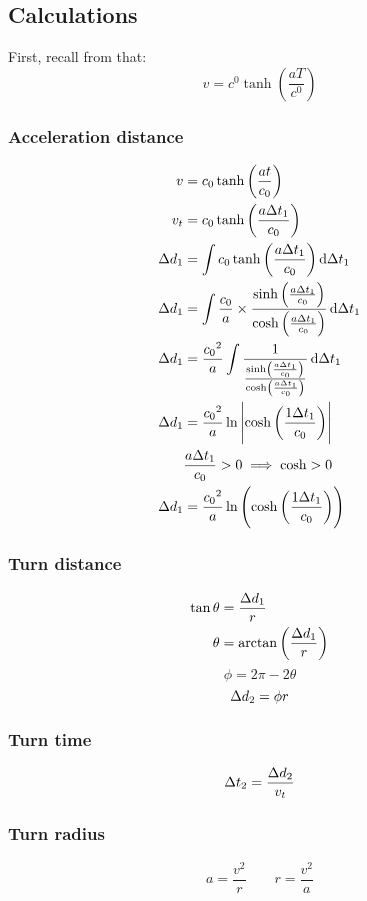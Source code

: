 	\subsection{Calculations}
		First, recall from \cite{sracceleration} that:
		\[v = \si{\clight} \tanh \left(\frac{aT}{\si{\clight}}\right)\]
		\begin{samepagecols}{2}
			\subsubsection{Acceleration distance}
			\begin{align*}
				v &= \si{\clight}\tanh\left(\frac{at}{\si{\clight}}\right)\\
				v_t &= \si{\clight}\tanh\left(\frac{a \Del t_1}{\si{\clight}}\right)\\
				\Del d_1 &= \int \si{\clight}\tanh\left(\frac{a \Del t_1}{\si{\clight}}\right) \dif \Del t_1\\
				\Del d_1 &= \int \frac{\si{\clight}}{a} \times \frac{\sinh\left(\frac{a \Del t_1}{\si{\clight}}\right)}{\cosh\left(\frac{a \Del t_1}{\si{\clight}}\right)} \dif \Del t_1\\
				\Del d_1 &= \frac{\si{\clight}^2}{a} \int \frac{1}{\frac{\sinh\left(\frac{a \Del t_1}{\si{\clight}}\right)}{\cosh\left(\frac{a \Del t_1}{\si{\clight}}\right)}} \dif \Del t_1\\
				\Del d_1 &= \frac{\si{\clight}^2}{a} \ln\left| \cosh\left(\frac{1 \Del t_1}{\si{\clight}}\right)\right|\\
				&\frac{a \Del t_1}{\si{\clight}} > 0 \implies \cosh > 0\\
				\Del d_1 &= \frac{\si{\clight}^2}{a} \ln\left(\cosh\left(\frac{1 \Del t_1}{\si{\clight}}\right)\right)
			\end{align*}
			\columnbreak
			\subsubsection{Turn distance}
				\begin{align*}
					\tan \theta &= \frac{\mathrm{\Delta} d_1}{r}\\
					\theta &= \arctan\left(\frac{\mathrm{\Delta} d_1}{r}\right)
				\end{align*}
				\begin{equation*}
					\phi = 2\pi - 2\theta
				\end{equation*}
				\begin{equation*}
					\mathrm{\Delta} d_2 = \phi r
				\end{equation*}
			\subsubsection{Turn time}
				\begin{equation*}
					\mathrm{\Delta} t_2 = \frac{\mathrm{\Delta} d_2}{v_t}
				\end{equation*}
			\subsubsection{Turn radius}
				\begin{equation*}
					a = \frac{v^2}{r} \qquad r = \frac{v^2}{a}
				\end{equation*}
		\end{samepagecols}
	\newpage
